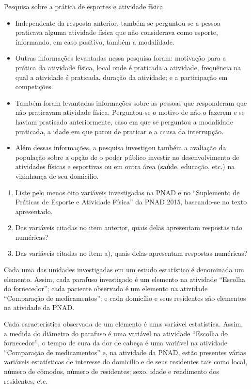 \begin{task}{ Pesquisa sobre a prática de esportes e atividade física}
\begin{itemize}
\item {} 
Independente da resposta anterior, também se perguntou se a pessoa praticava alguma atividade física que não considerava como esporte, informando, em caso positivo, também a modalidade.

\item {} 
Outras informações levantadas nessa pesquisa foram: motivação para a prática da atividade física, local onde é praticada a atividade, frequência na qual a atividade é praticada, duração da atividade; e a participação em competições.

\item {} 
Também foram levantadas informações sobre as pessoas que responderam que não praticavam atividade física. Perguntou-se o motivo de não o fazerem e se haviam praticado anteriormente, caso em que se perguntou a modalidade praticada, a idade em que parou de praticar e a causa da interrupção.

\item {} 
Além dessas informações, a pesquisa investigou também a avaliação da população sobre a opção de o poder público investir no desenvolvimento de atividades físicas e esportivas ou em outra área (saúde, educação, etc.) na vizinhança de seu domicílio.

\end{itemize}
\begin{enumerate}
\item {} 
Liste pelo menos oito variáveis investigadas na PNAD e no ``Suplemento de Práticas de Esporte e Atividade Física'' da PNAD 2015, baseando-se no texto apresentado.

\item {} 
Das variáveis citadas no item anterior, quais delas apresentam respostas não numéricas?

\item {} 
Das variáveis citadas no item a), quais delas apresentam respostas numéricas?

\end{enumerate}

Cada uma das unidades investigadas em um estudo estatístico é denominada um elemento.  Assim, cada parafuso investigado é um elemento na atividade ``Escolha do fornecedor''; cada paciente observado é um elemento na atividade ``Comparação de medicamentos''; e cada domicílio e seus residentes são elementos na atividade da PNAD.

Cada característica observada de um elemento é uma variável estatística. Assim, a medida do diâmetro do parafuso é uma variável na atividade ``Escolha do fornecedor'', o tempo de cura da dor de cabeça é uma variável na atividade ``Comparação de medicamentos'' e, na atividade da PNAD, estão presentes várias variáveis estatísticas de interesse do domicílio e de seus residentes tais como local, número de cômodos, número de residentes; sexo, idade e rendimento dos residentes, etc.
\end{task}

